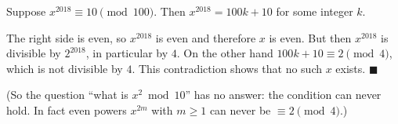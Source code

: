 Suppose $x^{2018}\equiv10\pmod{100}$. Then $x^{2018}=100k+10$ for some integer $k$.

The right side is even, so $x^{2018}$ is even and therefore $x$ is even. But then $x^{2018}$ is divisible by $2^{2018}$, in particular by $4$. On the other hand $100k+10\equiv2\pmod4$, which is not divisible by $4$. This contradiction shows that no such $x$ exists. $\blacksquare$

(So the question ``what is $x^2\bmod10$'' has no answer: the condition can never hold. In fact even powers $x^{2m}$ with $m\ge1$ can never be $\equiv2\pmod 4$.)
